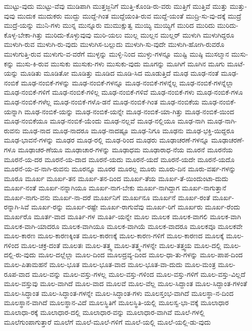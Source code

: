 {ಮುಟ್ಟು-ವುದು
ಮುಟ್ಟು-ವೆವು
ಮುಡಿಪಾಗಿ
ಮುತ್ತಜ್ಜನಿಗೆ
ಮುತ್ತಿ-ಕೊಂಡಿ-ರು-ವರು
ಮುತ್ತಿಗೆ
ಮುತ್ತಿವೆ
ಮುತ್ತು
ಮುತ್ತು-ವುವು
ಮುದುಕ
ಮುದುಕರು
ಮುದ್ದು
ಮುದ್ದೆ-ಗಿಂತ
ಮುದ್ದೆಯಂತಿ-ರುವ
ಮುದ್ದೆ-ಯಂತೆ
ಮುದ್ರಿ-ಸು-ವು-ದಕ್ಕೆ
ಮುದ್ರೆ
ಮುದ್ರೆ-ಯನ್ನು
ಮುನಿ-ಗಳು
ಮುನ್ನ
ಮುನ್ನೂರು
ಮುಮುಕ್ಷುತ್ವ
ಮುಯ್ಯಿ
ಮುಯ್ಯಿಗೆ
ಮುರಿದ
ಮುರಿದು
ಮುರಿದು-ಕೊಳ್ಳ-ಬೇಕಾ-ಗಿತ್ತು
ಮುರಿದು-ಕೊಳ್ಳುವುವು
ಮುರಿ-ಯಲು
ಮುಲ್ಲ
ಮುಲ್ಲನ
ಮುಲ್ಲರ್
ಮುಳುಗಿ
ಮುಳುಗಿದ್ದರೂ
ಮುಳುಗಿ-ರುವ
ಮುಳುಗಿ-ರು-ವುದು
ಮುಳುಗಿಸ-ಬಲ್ಲುದು
ಮುಳುಗಿ-ಸು-ವುದೇ
ಮುಳುಗಿ-ಹೋಗಿ-ರುವರೊ
ಮುಳುಗುತ್ತಿ-ರುವ
ಮುಳುಗು-ವ-ವರೆಗೆ
ಮುಳ್ಳನ್ನು
ಮುಳ್ಳಿ-ನಿಂದ
ಮುಳ್ಳು-ಗಳನ್ನೂ
ಮುಷ್ಟಿ
ಮುಷ್ಠಿ
ಮುಸಲ್ಮಾನ
ಮುಸು-ಕನ್ನು
ಮುಸು-ಕಿ-ರುವ
ಮುಸುಕು
ಮುಸುಕು-ಗಳು
ಮುಸುಕು-ವುದು
ಮೂಗನ್ನು
ಮೂಗಿಗೆ
ಮೂಗಿನ
ಮೂಗು
ಮೂಟೆ-ಯನ್ನು
ಮೂಡಿತು
ಮೂಡಿತೋ
ಮೂಡಿತ್ತು
ಮೂಡಿದ
ಮೂಡಿ-ಸಿದ
ಮೂಡುತ್ತಿದೆ
ಮೂಢ
ಮೂಢ-ನಂತೆ
ಮೂಢ-ನಂಬಿಕೆ
ಮೂಢ-ನಂಬಿಕೆ-ಗಳನ್ನು
ಮೂಢ-ನಂಬಿಕೆ-ಗಳನ್ನೂ
ಮೂಢ-ನಂಬಿಕೆ-ಗಳನ್ನೆಲ್ಲ
ಮೂಢ-ನಂಬಿಕೆ-ಗಳನ್ನೆಲ್ಲಾ
ಮೂಢ-ನಂಬಿಕೆ-ಗಳಿಗೆ
ಮೂಢ-ನಂಬಿಕೆ-ಗಳಿಲ್ಲ
ಮೂಢ-ನಂಬಿಕೆ-ಗಳಿವೆ
ಮೂಢ-ನಂಬಿಕೆ-ಗಳು
ಮೂಢ-ನಂಬಿಕೆ-ಗಳೂ
ಮೂಢ-ನಂಬಿಕೆ-ಗಳೆಲ್ಲ
ಮೂಢ-ನಂಬಿಕೆ-ಗಳೊ-ಡನೆ
ಮೂಢ-ನಂಬಿಕೆ-ಗಿಂತ
ಮೂಢ-ನಂಬಿಕೆಯ
ಮೂಢ-ನಂಬಿಕೆ-ಯನ್ನಾಗಿ
ಮೂಢ-ನಂಬಿಕೆ-ಯನ್ನು
ಮೂಢ-ನಂಬಿಕೆ-ಯನ್ನೇ
ಮೂಢ-ನಂಬಿಕೆ-ಯಾ-ಗಿತ್ತು
ಮೂಢ-ನಂಬಿಕೆ-ಯಿಂದ
ಮೂಢ-ನಂಬಿಕೆಯೂ
ಮೂಢ-ನಂಬಿಕೆ-ಯೆಂದು
ಮೂಢ-ನಲ್ಲವೆ
ಮೂಢ-ನಲ್ಲಿಯೂ
ಮೂಢ-ನಾಗಿ
ಮೂಢ-ನಾಗಿ-ರುವನು
ಮೂಢ-ನಾದ
ಮೂಢ-ನಾದರೂ
ಮೂಢ-ನಾದಷ್ಟೂ
ಮೂಢ-ನಿಗೂ
ಮೂಢನು
ಮೂಢ-ಭಕ್ತಿ-ಯಿದ್ದರೂ
ಮೂಢ-ಭಾವನೆ-ಗಳನ್ನು
ಮೂಢರ
ಮೂಢ-ರಲ್ಲಿ
ಮೂಢ-ರಿಂದ
ಮೂಢರು
ಮೂಢಾಚರಣೆ-ಗಳನ್ನೂ
ಮೂಢಾಚರಣೆ-ಗಳೂ
ಮೂಢಾಚರ-ಣೆಯೂ
ಮೂಢಾಚಾರ-ಗಳನ್ನು
ಮೂಢಾಧಮ
ಮೂಢಾರಾಧ-ನೆಯ
ಮೂರನೆ
ಮೂರನೆಯ
ಮೂರನೆ-ಯ-ದರ
ಮೂರನೆ-ಯ-ದಾದ
ಮೂರನೆ-ಯದು
ಮೂರನೆ-ಯದೆ
ಮೂರನೆ-ಯದೇ
ಮೂರನೆ-ಯದೊ
ಮೂರನೆ-ಯ-ವ-ನಾಗಿ-ರುವನು
ಮೂರನ್ನೂ
ಮೂರರ
ಮೂರಲ್ಲ
ಮೂರು
ಮೂರು-ದಿನ
ಮೂರು-ವರ್ಷ-ಗಳನ್ನು
ಮೂರೂ
ಮೂರ್ಖ
ಮೂರ್ಖ-ತನ
ಮೂರ್ಖ-ತನ-ದಿಂದ
ಮೂರ್ಖ-ತೆಯ
ಮೂರ್ಖ-ತೆ-ಯಿಂದುಂಟಾ-ದುದು
ಮೂರ್ಖ-ನಂತೆ
ಮೂರ್ಖ-ನನ್ನಾಗಿಯೂ
ಮೂರ್ಖ-ನಾಗ-ಬೇಕು
ಮೂರ್ಖ-ನಾಗಿದ್ದಾಗ
ಮೂರ್ಖ-ನಾಗುತ್ತಾನೆ
ಮೂರ್ಖ-ನಾಗು-ವನು
ಮೂರ್ಖ-ನಾ-ದರೆ
ಮೂರ್ಖನಿಗೆ
ಮೂರ್ಖನೂ
ಮೂರ್ಖನೆ
ಮೂರ್ಖ-ರಂತೆ
ಮೂರ್ಖ-ರನ್ನಾಗಿ-ಸಿವೆ
ಮೂರ್ಖ-ರನ್ನು
ಮೂರ್ಖ-ರಷ್ಟೇ
ಮೂರ್ಖ-ರಾಗುವೆವು
ಮೂರ್ಖ-ರಿಗೆ
ಮೂರ್ಖರು
ಮೂರ್ಖ-ರೆಂದು
ಮೂರ್ಖರೊ
ಮೂರ್ತ-ವಾದ
ಮೂರ್ತಿ-ಗಳ
ಮೂರ್ತಿ-ಯನ್ನೇ
ಮೂಲ
ಮೂಲಕ
ಮೂಲಕ-ವಾಗಲಿ
ಮೂಲಕ-ವಾಗಿ
ಮೂಲಕ-ವಾಗಿ-ಯಾದರೂ
ಮೂಲಕ-ವಾಗಿಯೂ
ಮೂಲಕ-ವಾಗಿಯೆ
ಮೂಲಕ-ವಾದರೂ
ಮೂಲಕವೂ
ಮೂಲಕವೇ
ಮೂಲ-ಕಾರಣ
ಮೂಲ-ಕಾರಣಕ್ಕಿಂತ
ಮೂಲ-ಕಾರಣಕ್ಕೆ
ಮೂಲ-ಕಾರಣ-ಗಳಿಗೆ
ಮೂಲ-ಕಾರಣದ
ಮೂಲಕ್ಕೆ
ಮೂಲ-ಗಳಿಂದ
ಮೂಲ-ಚಕ್ರ-ದಂತೆ
ಮೂಲತಃ
ಮೂಲ-ತತ್ತ್ವ
ಮೂಲ-ತತ್ತ್ವ-ಗಳನ್ನೇ
ಮೂಲ-ತತ್ತ್ವಯ
ಮೂಲ-ದಲ್ಲಿ
ಮೂಲ-ದಲ್ಲಿ-ರು-ವುದು
ಮೂಲ-ದಲ್ಲೆಲ್ಲಾ
ಮೂಲ-ದಿಂದ
ಮೂಲದ್ರವ್ಯ-ದಿಂದ
ಮೂಲ-ಧಾ-ತು-ಗಳನ್ನು
ಮೂಲ-ಪಾಪ-ದಿಂದ
ಮೂಲ-ಪಿತಾಮಹನೆ
ಮೂಲ-ಭೂತ
ಮೂಲ-ಭೂತ-ವಾದ
ಮೂಲ-ಭೂತ-ವಾ-ದುದು
ಮೂಲ-ಮಂತ್ರ
ಮೂಲ-ರೂಪ-ವಾದ
ಮೂಲ-ವನ್ನು
ಮೂಲ-ವಸ್ತು-ಗಳಲ್ಲ
ಮೂಲ-ವಸ್ತು-ಗಳಿಂದ
ಮೂಲ-ವಸ್ತು-ಗಳಿಗೆ
ಮೂಲ-ವಸ್ತು-ವಿಲ್ಲದೆ
ಮೂಲ-ವಸ್ತುವು
ಮೂಲ-ವಾಗಿದೆ
ಮೂಲ-ವಾದ
ಮೂಲವೆ
ಮೂಲ-ವೆಲ್ಲ
ಮೂಲ-ಸಿದ್ದಾಂತ
ಮೂಲ-ಸಿದ್ದಾಂತ-ಗಳಂತೆ
ಮೂಲ-ಸಿದ್ಧಾಂತ
ಮೂಲ-ಸಿದ್ಧಾಂತ-ಗಳನ್ನೇ
ಮೂಲ-ಸಿದ್ಧಾಂತ-ಗಳು
ಮೂಲಸ್ತಂಭ-ವಾಗಿದೆ
ಮೂಲಸ್ಥಾ-ನ-ದಿಂದ
ಮೂಲಸ್ಥಾನ-ವಾಗಿದೆ
ಮೂಲಸ್ಥಾನ-ವಿದೆ
ಮೂಲಸ್ಥಿತಿಗೆ
ಮೂಲಸ್ಥಿತಿ-ಯಲ್ಲಿ
ಮೂಲಸ್ವ-ಭಾ-ವಕ್ಕೆ
ಮೂಲಾಧಾರ
ಮೂಲಾಧಾ-ರಕ್ಕೆ
ಮೂಲಾಧಾರ-ದಲ್ಲಿ
ಮೂಲಾಧಾರ-ವನ್ನು
ಮೂಲಾಧಾರ-ವಾಗಿವೆ
ಮೂಲೆ-ಗಳಲ್ಲಿ
ಮೂಲೆಗುಂಪಾಗುತ್ತಾರೆ
ಮೂಲೆಗೆ
ಮೂಲೆ-ಮೂಲೆ-ಗಳಿಗೆ
ಮೂಲೆ-ಯಲ್ಲಿ
ಮೂಲೆ-ಯಲ್ಲಿ-ಡು-ವುದು
}
